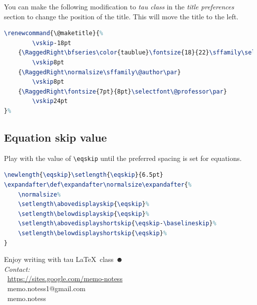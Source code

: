 \documentclass[9pt,a4paper,twoside]{tau}
\begin{document}
         You can make the following modification to \textit{tau class} in the \textit{title preferences} section to change the position of the title. This will move the title to the left. 

\begin{lstlisting}[language=TeX, caption=Alternative title.]
\renewcommand{\@maketitle}{%
        \vskip-18pt
    {\RaggedRight\bfseries\color{taublue}\fontsize{18}{22}\sffamily\selectfont\@title\par}
		\vskip8pt
    {\RaggedRight\normalsize\sffamily\@author\par}
        \vskip8pt
    {\RaggedRight\fontsize{7pt}{8pt}\selectfont\@professor\par}
        \vskip24pt
}% 
\end{lstlisting}

    \subsection{Equation skip value}

        Play with the value of \verb|\eqskip| until the preferred spacing is set for equations.

\begin{lstlisting}[language=TeX, caption=Equation skip code.]
\newlength{\eqskip}\setlength{\eqskip}{6.5pt}
\expandafter\def\expandafter\normalsize\expandafter{%
    \normalsize%
    \setlength\abovedisplayskip{\eqskip}%
    \setlength\belowdisplayskip{\eqskip}%
    \setlength\abovedisplayshortskip{\eqskip-\baselineskip}%
    \setlength\belowdisplayshortskip{\eqskip}%
}
\end{lstlisting}
					

\printbibliography


\begin{center}
	\vskip10pt
	Enjoy writing with tau \LaTeX\ class $\blacksmiley$ \\ 
	\vskip10pt
	\textit{Contact:} \\
	\faLink\ \href{https://sites.google.com/view/memo-notess/p%C3%A1gina-principal}{https://sites.google.com/memo-notess} \\
	\faEnvelope[regular]\ memo.notess1@gmail.com \\
	\faInstagram\ memo.notess\\
\end{center}

\end{document}
